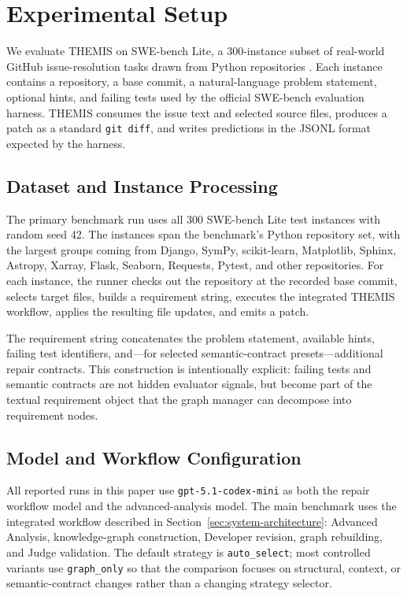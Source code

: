 \documentclass[11pt]{article}
\begin{document}
\section{Experimental Setup}
\label{sec:experimental-setup}

We evaluate THEMIS on SWE-bench Lite, a 300-instance subset of real-world GitHub issue-resolution tasks drawn from Python repositories \citep{jimenez-etal-2024-swebench}.  Each instance contains a repository, a base commit, a natural-language problem statement, optional hints, and failing tests used by the official SWE-bench evaluation harness.  THEMIS consumes the issue text and selected source files, produces a patch as a standard \texttt{git diff}, and writes predictions in the JSONL format expected by the harness.

\subsection{Dataset and Instance Processing}
\label{subsec:dataset-processing}

The primary benchmark run uses all 300 SWE-bench Lite test instances with random seed 42.  The instances span the benchmark's Python repository set, with the largest groups coming from Django, SymPy, scikit-learn, Matplotlib, Sphinx, Astropy, Xarray, Flask, Seaborn, Requests, Pytest, and other repositories.  For each instance, the runner checks out the repository at the recorded base commit, selects target files, builds a requirement string, executes the integrated THEMIS workflow, applies the resulting file updates, and emits a patch.

The requirement string concatenates the problem statement, available hints, failing test identifiers, and---for selected semantic-contract presets---additional repair contracts.  This construction is intentionally explicit: failing tests and semantic contracts are not hidden evaluator signals, but become part of the textual requirement object that the graph manager can decompose into requirement nodes.

\subsection{Model and Workflow Configuration}
\label{subsec:model-workflow-config}

All reported runs in this paper use \texttt{gpt-5.1-codex-mini} as both the repair workflow model and the advanced-analysis model.  The main benchmark uses the integrated workflow described in Section~\ref{sec:system-architecture}: Advanced Analysis, knowledge-graph construction, Developer revision, graph rebuilding, and Judge validation.  The default strategy is \texttt{auto\_select}; most controlled variants use \texttt{graph\_only} so that the comparison focuses on structural, context, or semantic-contract changes rather than a changing strategy selector.
\end{document}
